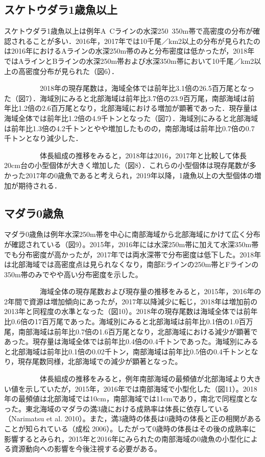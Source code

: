 \documentclass[11pt]{article} %
\begin{document}
\begin{linenumbers}
\subsection{スケトウダラ1歳魚以上}
スケトウダラ1歳魚以上は例年A~Cラインの水深250~350m帯で高密度の分布が確認されることが多い．2016年，2017年では10千尾／km2以上の分布が見られたのは2016年におけるAラインの水深250m帯のみと分布密度は低かったが，2018年ではAラインとBラインの水深250m帯および水深350m帯において10千尾／km2以上の高密度分布が見られた（図6）．

\ \ \ \ \ \ \ \ \ \ 
2018年の現存尾数は，海域全体では前年比3.1倍の26.5百万尾となった（図7）．海域別にみると北部海域は前年比3.7倍の23.9百万尾，南部海域は前年比1.2倍の2.6百万尾となり，北部海域における増加が顕著であった．現存量は海域全体では前年比1.2倍の4.9千トンとなった（図7）．海域別にみると北部海域は前年比1.3倍の4.2千トンとやや増加したものの，南部海域は前年比0.7倍の0.7千トンとなり減少した．

\ \ \ \ \ \ \ \ \ \ 
体長組成の推移をみると，2018年は2016，2017年と比較して体長20cm台の小型個体が大きく増加した（図8）．これらの小型個体は現存尾数が多かった2017年の0歳魚であると考えられ，2019年以降，1歳魚以上の大型個体の増加が期待される．

\subsection{マダラ0歳魚}
マダラ0歳魚は例年水深250m帯を中心に南部海域から北部海域にかけて広く分布が確認されている（図9）。2015年，2016年には水深250m帯に加えて水深350m帯でも分布密度が高かったが，2017年では両水深帯で分布密度は低下した。2018年は北部海域では高密度点は見られなくなり，南部Eラインの250m帯とFラインの350m帯のみでやや高い分布密度を示した。

\ \ \ \ \ \ \ \ \ \ 
海域全体の現存尾数および現存量の推移をみると，2015年，2016年の2年間で資源は増加傾向にあったが，2017年以降減少に転じ，2018年は増加前の2013年と同程度の水準となった（図10）。2018年の現存尾数は海域全体では前年比0.6倍の17百万尾であった。海域別にみると北部海域は前年比0.1倍の1.0百万尾，南部海域は前年比0.7倍の1.6百万尾となり，北部海域における減少が顕著であった。現存量は海域全体では前年比0.4倍の0.4千トンであった。海域別にみると北部海域は前年比0.1倍の0.02千トン，南部海域は前年比0.5倍の0.4千トンとなり，現存尾数同様，北部海域での減少が顕著となった。

\ \ \ \ \ \ \ \ \ \ 
体長組成の推移をみると，例年南部海域の最頻値が北部海域より大きい値を示していたが，2015年，2016年では南部海域で小型化した（図11）。2018年の最頻値は北部海域では10cm，南部海域では11cmであり，南北で同程度となった。東北海域のマダラの満3歳における成熟率は体長に依存している（Narimatsu et al. 2010）。また，満3歳時の体長は0歳時の体長と正の相関があることが知られている（成松 2006）。したがって0歳時の体長はその後の成熟率に影響するとみられ，2015年と2016年にみられたの南部海域の0歳魚の小型化による資源動向への影響を今後注視する必要がある。


\end{linenumbers}
\end{document}
